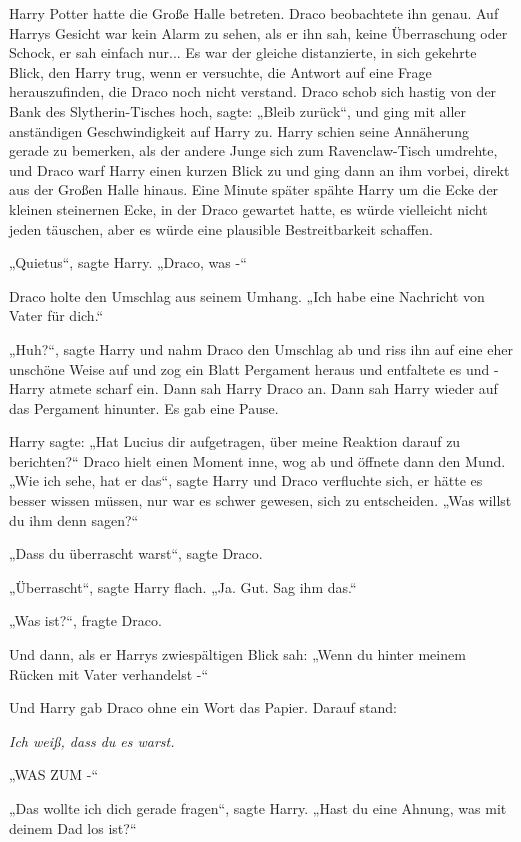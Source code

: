 {Harry Potter hatte die Große Halle betreten. Draco beobachtete ihn genau. Auf Harrys Gesicht war kein Alarm zu sehen, als er ihn sah, keine Überraschung oder Schock, er sah einfach nur... Es war der gleiche distanzierte, in sich gekehrte Blick, den Harry trug, wenn er versuchte, die Antwort auf eine Frage herauszufinden, die Draco noch nicht verstand. Draco schob sich hastig von der Bank des Slytherin-Tisches hoch, sagte: „Bleib zurück“, und ging mit aller anständigen Geschwindigkeit auf Harry zu. Harry schien seine Annäherung gerade zu bemerken, als der andere Junge sich zum Ravenclaw-Tisch umdrehte, und Draco warf Harry einen kurzen Blick zu und ging dann an ihm vorbei, direkt aus der Großen Halle hinaus. Eine Minute später spähte Harry um die Ecke der kleinen steinernen Ecke, in der Draco gewartet hatte, es würde vielleicht nicht jeden täuschen, aber es würde eine plausible Bestreitbarkeit schaffen.

„Quietus“, sagte Harry. „Draco, was -“

Draco holte den Umschlag aus seinem Umhang. „Ich habe eine Nachricht von Vater für dich.“

„Huh?“, sagte Harry und nahm Draco den Umschlag ab und riss ihn auf eine eher unschöne Weise auf und zog ein Blatt Pergament heraus und entfaltete es und - Harry atmete scharf ein. Dann sah Harry Draco an. Dann sah Harry wieder auf das Pergament hinunter. Es gab eine Pause.

Harry sagte: „Hat Lucius dir aufgetragen, über meine Reaktion darauf zu berichten?“ Draco hielt einen Moment inne, wog ab und öffnete dann den Mund.\\ „Wie ich sehe, hat er das“, sagte Harry und Draco verfluchte sich, er hätte es besser wissen müssen, nur war es schwer gewesen, sich zu entscheiden. „Was willst du ihm denn sagen?“

„Dass du überrascht warst“, sagte Draco.

„Überrascht“, sagte Harry flach. „Ja. Gut. Sag ihm das.“

„Was ist?“, fragte Draco.

Und dann, als er Harrys zwiespältigen Blick sah: „Wenn du hinter meinem Rücken mit Vater verhandelst -“

Und Harry gab Draco ohne ein Wort das Papier. Darauf stand:

\emph{Ich weiß, dass du es warst.}

„WAS ZUM -“

„Das wollte ich dich gerade fragen“, sagte Harry. „Hast du eine Ahnung, was mit deinem Dad los ist?“

}
